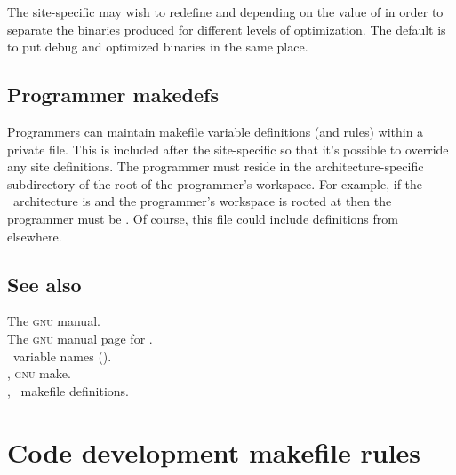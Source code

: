 The site-specific  may wish to redefine  and
 depending on the value of  in order to separate the
binaries produced for different levels of optimization.  The default is to put
debug and optimized binaries in the same place.

\subsection*{Programmer makedefs}

Programmers can maintain makefile variable definitions (and rules) within a
private  file.  This is included after the site-specific
 so that it's possible to override any site definitions.  The
programmer  must reside in the architecture-specific
subdirectory of the root of the programmer's workspace.  For example, if the
\aipspp\ architecture is  and the programmer's workspace is
rooted at  then the programmer  must be
.  Of course, this file could
include  definitions from elsewhere.

\subsection*{See also}

The \textsc{gnu}  manual.\\
The \textsc{gnu} manual page for .\\
\aipspp\ variable names ().\\
, \textsc{gnu} make.\\
, \aipspp\ makefile definitions.


\newpage
\section{Code development makefile rules}
\label{Code development makefile rules}


